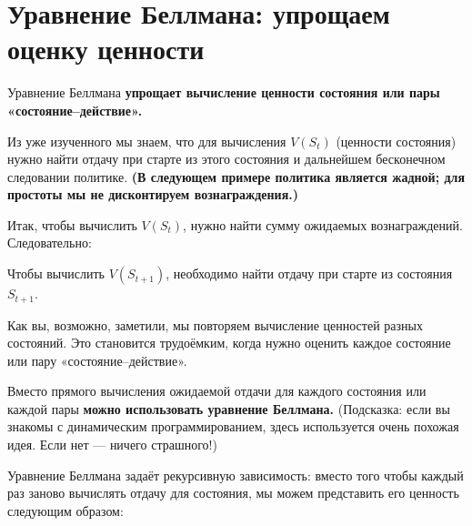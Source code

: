 \documentclass[11pt,a4paper]{article}
\begin{document}
\section{Уравнение Беллмана: упрощаем оценку ценности}\label{the-bellman-equation-simplify-our-value-estimation}

Уравнение Беллмана \textbf{упрощает вычисление ценности состояния или пары «состояние--действие».}


Из уже изученного мы знаем, что для вычисления \(V(S_t)\) (ценности состояния) нужно найти отдачу при старте из этого состояния и дальнейшем бесконечном следовании политике. \textbf{(В следующем примере политика является жадной; для простоты мы не дисконтируем вознаграждения.)}

Итак, чтобы вычислить \(V(S_t)\), нужно найти сумму ожидаемых вознаграждений. Следовательно:


Чтобы вычислить \(V(S_{t+1})\), необходимо найти отдачу при старте из состояния \(S_{t+1}\).


Как вы, возможно, заметили, мы повторяем вычисление ценностей разных состояний. Это становится трудоёмким, когда нужно оценить каждое состояние или пару «состояние--действие».

Вместо прямого вычисления ожидаемой отдачи для каждого состояния или каждой пары \textbf{можно использовать уравнение Беллмана.} (Подсказка: если вы знакомы с динамическим программированием, здесь используется очень похожая идея. Если нет --- ничего страшного!)

Уравнение Беллмана задаёт рекурсивную зависимость: вместо того чтобы каждый раз заново вычислять отдачу для состояния, мы можем представить его ценность следующим образом:
\end{document}
